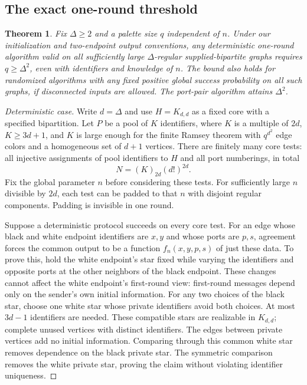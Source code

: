 \documentclass[11pt]{article}
\newtheorem{theorem}{Theorem}[section]
\theoremstyle{definition}
\theoremstyle{remark}
\begin{document}
\subsection{The exact one-round threshold}
\begin{theorem}\label{thm:oneround}
Fix $\Delta\ge2$ and a palette size $q$ independent of $n$. Under
our initialization and two-endpoint output conventions, any deterministic
one-round algorithm valid on all sufficiently large $\Delta$-regular
supplied-bipartite graphs requires $q\ge\Delta^2$, even with identifiers
and knowledge of $n$. The bound also holds for randomized algorithms with
any fixed positive global success probability on all such graphs, if
disconnected inputs are allowed. The port-pair algorithm attains $\Delta^2$.
\end{theorem}
\begin{proof}[Deterministic case]
Write $d=\Delta$ and use $H=K_{d,d}$ as a fixed core with a specified
bipartition. Let $P$ be a pool of $K$ identifiers, where $K$ is a multiple
of $2d$, $K\ge3d+1$, and $K$ is large enough for the finite Ramsey
theorem with $q^{d^2}$ edge colors and a homogeneous set of $d+1$
vertices. There are finitely many core tests: all injective assignments
of pool identifiers to $H$ and all port numberings, in total
\[
 N=(K)_{2d}(d!)^{2d}.
\]
Fix the global parameter $n$ before considering these tests. For
sufficiently large $n$ divisible by $2d$, each test can be padded to
that $n$ with disjoint regular components. Padding is invisible in one round.

Suppose a deterministic protocol succeeds on every core test. For an
edge whose black and white endpoint identifiers are $x,y$ and whose
ports are $p,s$, agreement forces the common output to be a function
$f_n(x,y,p,s)$ of just these data. To prove this, hold the white
endpoint's star fixed while varying the identifiers and opposite ports
at the other neighbors of the black endpoint. These changes cannot affect
the white endpoint's first-round view: first-round messages depend only
on the sender's own initial information. For any two choices of the
black star, choose one white star whose private identifiers avoid both
choices. At most $3d-1$ identifiers are needed. These compatible stars
are realizable in $K_{d,d}$; complete unused vertices with distinct
identifiers. The edges between private vertices add no initial
information. Comparing through this common white star removes dependence
on the black private star. The symmetric comparison removes the white
private star, proving the claim without violating identifier uniqueness.


\end{proof}
\end{document}
